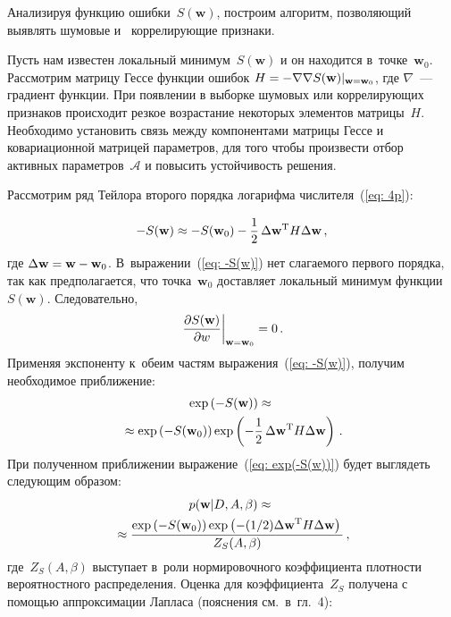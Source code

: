 \begin{multicols}{2}
Анализируя функцию ошибки~$S(\mathbf{w})$, построим алгоритм, позволяющий 
выявлять шумовые и~ коррелирующие признаки.

Пусть нам известен локальный минимум~$S(\mathbf{w})$ и он находится
в~точке~$\mathbf{w}_0$. Рассмотрим матрицу Гессе функции ошибок 
$H\hm= - \nabla \nabla S(\mathbf{w})|_{\mathbf{w=w}_0}$, где $\nabla$~---
градиент функции. При появлении в выборке шумовых или коррелирующих
признаков происходит резкое возрастание некоторых элементов
матрицы~$H$. Необходимо установить связь между компонентами матрицы
Гессе и~ ковариационной матрицей параметров, для того чтобы
произвести отбор активных параметров~$\mathcal{A}$ и повысить
устойчивость решения.

Рассмотрим ряд Тейлора второго порядка логарифма числителя~(\ref{eq: 4p}):

\noindent
\begin{equation}
\label {eq: -S(w)}
-S(\mathbf{w}) \approx -S(\mathbf{w}_0)-\displaystyle\frac{\displaystyle 1\mathstrut}{\displaystyle 2\mathstrut}\,\Delta\mathbf{w}^{\mathrm{T}}H\Delta\mathbf{w}\,,
\end{equation}
где $\Delta\mathbf{w}\hm=\mathbf{w}\hm-\mathbf{w}_0$.
В~выражении~(\ref{eq: -S(w)}) нет сла\-га\-емо\-го первого порядка, так
как предполагается, что точка~$\mathbf{w}_0$ доставляет локальный
минимум функции~$S(\mathbf{w})$. Следовательно,
$$
\left. \displaystyle\frac{\displaystyle \partial S(\mathbf{w})\mathstrut}{\displaystyle \partial w\mathstrut} \right|_{\mathbf{w} = \mathbf{w}_0}  = 0\,.
$$
Применяя экспоненту к~обеим частям выражения~(\ref{eq: -S(w)}), получим необходимое приближение:
\begin{multline}
\label {eq: exp(-S(w))}
\exp\left(-S(\mathbf{w})\right) \approx {}\\
{}\approx\exp\left(-S(\mathbf{w}_0)\right)
\exp\left(-\displaystyle\frac{\displaystyle 1\mathstrut}{\displaystyle 2\mathstrut}\,\Delta\mathbf{w}^{\mathrm{T}}H\Delta\mathbf{w}\right)\,.
\end{multline}
При полученном приближении выражение~(\ref{eq: exp(-S(w))}) будет выглядеть следующим образом:
\begin{multline}
\label {eq: p(w|D,A,B)}
p(\mathbf{w}|D,A,\beta) \approx{}\\
{}\approx \displaystyle\frac{\displaystyle \exp\left(-S(\mathbf{w}_0)\right)
\exp\left(-({1}/{2})\Delta\mathbf{w}^{\mathrm{T}}H\Delta\mathbf{w}\right)\mathstrut}{\displaystyle Z_{S}(A,\beta)\mathstrut}\,,
\end{multline}
где~$Z_S(A,\beta)$ выступает в~роли нормировочного коэффициента
плотности вероятностного распределения. Оценка для
коэффициента~$Z_S$ получена с помощью аппроксимации Лапласа
(пояснения см.\ в~гл.~4):
\begin{equation}
\label {eq: ZS}

\end{equation}
\end{multicols}
